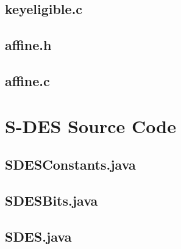 \documentclass[]{article}
\begin{document}
\subsection*{keyeligible.c}
\pagebreak{}
\subsection*{affine.h}
\pagebreak{}
\subsection*{affine.c}
\pagebreak{}


\vspace*{-0.8cm}
	\section*{S-DES Source Code}

\subsection*{SDESConstants.java}
\pagebreak{}
\subsection*{SDESBits.java}
\pagebreak{}
\subsection*{SDES.java}
\pagebreak{}


\break
\setlength{}
\printbibliography[title={References}]

\end{document}
